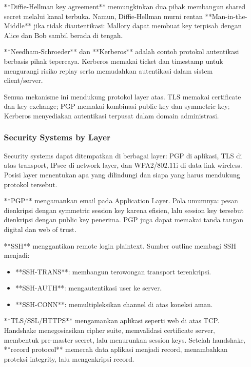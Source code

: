 **Diffie-Hellman key agreement** memungkinkan dua pihak membangun shared secret melalui kanal terbuka. Namun, Diffie-Hellman murni rentan **Man-in-the-Middle** jika tidak diautentikasi: Mallory dapat membuat key terpisah dengan Alice dan Bob sambil berada di tengah.

**Needham-Schroeder** dan **Kerberos** adalah contoh protokol autentikasi berbasis pihak tepercaya. Kerberos memakai ticket dan timestamp untuk mengurangi risiko replay serta memudahkan autentikasi dalam sistem client/server.

Semua mekanisme ini mendukung protokol layer atas. TLS memakai certificate dan key exchange; PGP memakai kombinasi public-key dan symmetric-key; Kerberos menyediakan autentikasi terpusat dalam domain administrasi.

\subsubsection{Security Systems by Layer}
\begin{jawab}
Security systems dapat ditempatkan di berbagai layer: PGP di aplikasi, TLS di atas transport, IPsec di network layer, dan WPA2/802.11i di data link wireless. Posisi layer menentukan apa yang dilindungi dan siapa yang harus mendukung protokol tersebut.
\end{jawab}

**PGP** mengamankan email pada Application Layer. Pola umumnya: pesan dienkripsi dengan symmetric session key karena efisien, lalu session key tersebut dienkripsi dengan public key penerima. PGP juga dapat memakai tanda tangan digital dan web of trust.

**SSH** menggantikan remote login plaintext. Sumber outline membagi SSH menjadi:
\begin{itemize}
    \item **SSH-TRANS**: membangun terowongan transport terenkripsi.
    \item **SSH-AUTH**: mengautentikasi user ke server.
    \item **SSH-CONN**: memultipleksikan channel di atas koneksi aman.
\end{itemize}

**TLS/SSL/HTTPS** mengamankan aplikasi seperti web di atas TCP. Handshake menegosiasikan cipher suite, memvalidasi certificate server, membentuk pre-master secret, lalu menurunkan session keys. Setelah handshake, **record protocol** memecah data aplikasi menjadi record, menambahkan proteksi integrity, lalu mengenkripsi record.

